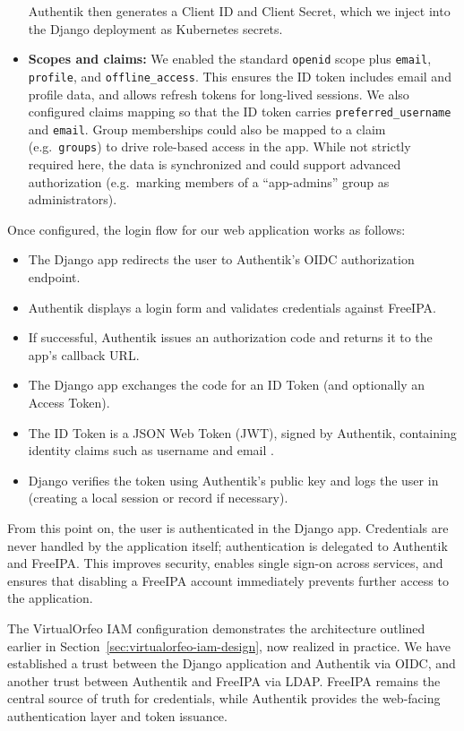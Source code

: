 \begin{itemize}
	Authentik then generates a Client ID and Client Secret, which we inject into the Django deployment as Kubernetes secrets.  
	
	\item \textbf{Scopes and claims:}  
	We enabled the standard \texttt{openid} scope plus \texttt{email}, \texttt{profile}, and \texttt{offline\_access}. This ensures the ID token includes email and profile data, and allows refresh tokens for long-lived sessions.  
	We also configured claims mapping so that the ID token carries \texttt{preferred\_username} and \texttt{email}. Group memberships could also be mapped to a claim (e.g.\ \texttt{groups}) to drive role-based access in the app. While not strictly required here, the data is synchronized and could support advanced authorization (e.g.\ marking members of a ``app-admins'' group as administrators).  
\end{itemize}

\medskip

Once configured, the login flow for our web application works as follows:  
\begin{itemize}
	\item The Django app redirects the user to Authentik’s OIDC authorization endpoint.  
	\item Authentik displays a login form and validates credentials against FreeIPA.  
	\item If successful, Authentik issues an authorization code and returns it to the app’s callback URL.  
	\item The Django app exchanges the code for an ID Token (and optionally an Access Token).  
	\item The ID Token is a JSON Web Token (JWT), signed by Authentik, containing identity claims such as username and email \parencite{OpenIDConnectCore}.  
	\item Django verifies the token using Authentik’s public key and logs the user in (creating a local session or record if necessary).  
\end{itemize}

From this point on, the user is authenticated in the Django app. Credentials are never handled by the application itself; authentication is delegated to Authentik and FreeIPA. This improves security, enables single sign-on across services, and ensures that disabling a FreeIPA account immediately prevents further access to the application.

\medskip

The VirtualOrfeo IAM configuration demonstrates the architecture outlined earlier in Section~\ref{sec:virtualorfeo-iam-design}, now realized in practice. We have established a trust between the Django application and Authentik via OIDC, and another trust between Authentik and FreeIPA via LDAP. FreeIPA remains the central source of truth for credentials, while Authentik provides the web-facing authentication layer and token issuance.  

